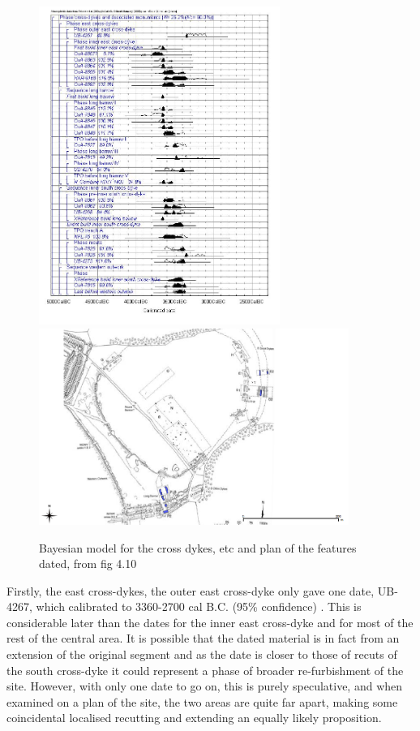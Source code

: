 \begin{figure}
\centering
	\includegraphics[width=0.7\textwidth]{figures/model3}
	\includegraphics[width=0.9\textwidth]{figures/model3-plan}
  \caption{Bayesian model for the cross dykes, etc and plan of the features dated, from fig 4.10 \citep[139]{Whittle:2011kl}}
  \label{fig:crossdykes}
\end{figure}

Firstly, the east cross-dykes, the outer east cross-dyke only gave one date, UB-4267, which calibrated to 3360-2700 cal B.C. (95\% confidence) \citep[122]{Whittle:2011kl}. This is considerable later than the dates for the inner east cross-dyke and for most of the rest of the central area. It is possible that the dated material is in fact from an extension of the original segment \citep[401]{Mercer:2008fk} and as the date is closer to those of recuts of the south cross-dyke it could represent a phase of broader re-furbishment of the site. However, with only one date to go on, this is purely speculative, and when examined on a plan of the site, the two areas are quite far apart, making some coincidental localised recutting and extending an equally likely proposition. 
 
